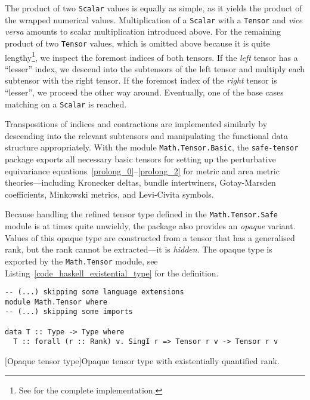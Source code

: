 The product of two \texttt{Scalar} values is equally as simple, as it yields the product of the wrapped numerical values. Multiplication of a \texttt{Scalar} with a \texttt{Tensor} and \emph{vice versa} amounts to scalar multiplication introduced above. For the remaining product of two \texttt{Tensor} values, which is omitted above because it is quite lengthy\footnote{See \cite{Alex_2020_safe-tensor} for the complete implementation.}, we inspect the foremost indices of both tensors. If the \emph{left} tensor has a ``lesser'' index, we descend into the subtensors of the left tensor and multiply each subtensor with the right tensor. If the foremost index of the \emph{right} tensor is ``lesser'', we proceed the other way around. Eventually, one of the base cases matching on a \texttt{Scalar} is reached.

Transpositions of indices and contractions are implemented similarly by descending into the relevant subtensors and manipulating the functional data structure appropriately. With the module \texttt{Math.Tensor.Basic}, the \texttt{safe-tensor} package exports all necessary basic tensors for setting up the perturbative equivariance equations~\ref{prolong_0}--\ref{prolong_2} for metric and area metric theories---including Kronecker deltas, bundle intertwiners, Gotay-Marsden coefficients, Minkowski metrics, and Levi-Civita symbols.

Because handling the refined tensor type defined in the \texttt{Math.Tensor.Safe} module is at times quite unwieldy, the package also provides an \emph{opaque} variant. Values of this opaque type are constructed from a tensor that has a generalised rank, but the rank cannot be extracted---it is \emph{hidden}. The opaque type is exported by the \texttt{Math.Tensor} module, see Listing~\ref{code_haskell_existential_type} for the definition.

\begin{code}
  \begin{verbatim}
-- (...) skipping some language extensions
module Math.Tensor where
-- (...) skipping some imports

data T :: Type -> Type where
  T :: forall (r :: Rank) v. SingI r => Tensor r v -> Tensor r v
  \end{verbatim}
  [Opaque tensor type]{Opaque tensor type with existentially quantified rank.}
  \label{code_haskell_existential_type}
\end{code}

